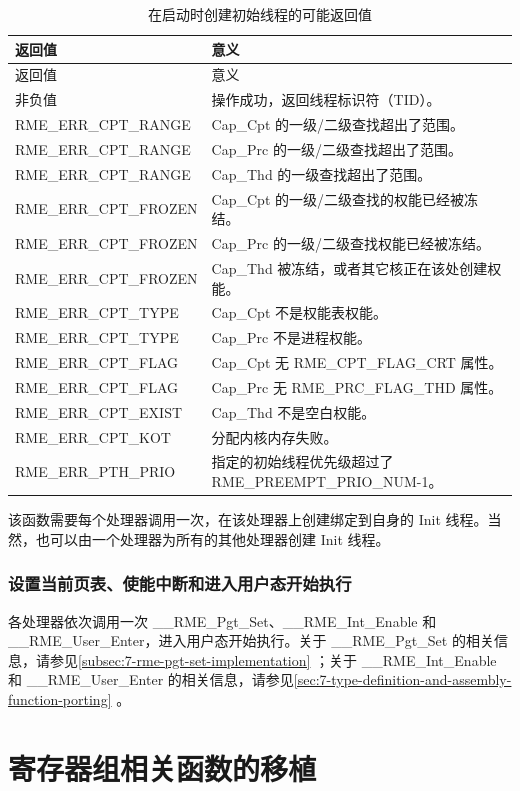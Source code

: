 \begin{xltabular}{\textwidth}{@{}>{\hsize\raggedright\arraybackslash}X>{\hsize\raggedright\arraybackslash}X@{}}
\caption{在启动时创建初始线程的可能返回值}\label{tab:7-60-create-initial-thread-at-boot-return-values}\\
\toprule
返回值 & 意义\tabularnewline
\endfirsthead
\toprule
返回值 & 意义\tabularnewline
\midrule
\endhead
\bottomrule
\endlastfoot
    非负值 & 操作成功，返回线程标识符（TID）。\tabularnewline
    RME\_ERR\_CPT\_RANGE & Cap\_Cpt 的一级/二级查找超出了范围。\tabularnewline
    RME\_ERR\_CPT\_RANGE & Cap\_Prc 的一级/二级查找超出了范围。\tabularnewline
    RME\_ERR\_CPT\_RANGE & Cap\_Thd 的一级查找超出了范围。\tabularnewline
    RME\_ERR\_CPT\_FROZEN & Cap\_Cpt 的一级/二级查找的权能已经被冻结。\tabularnewline
    RME\_ERR\_CPT\_FROZEN & Cap\_Prc 的一级/二级查找权能已经被冻结。\tabularnewline
    RME\_ERR\_CPT\_FROZEN & Cap\_Thd 被冻结，或者其它核正在该处创建权能。\tabularnewline
    RME\_ERR\_CPT\_TYPE & Cap\_Cpt 不是权能表权能。\tabularnewline
    RME\_ERR\_CPT\_TYPE & Cap\_Prc 不是进程权能。\tabularnewline
    RME\_ERR\_CPT\_FLAG & Cap\_Cpt 无 RME\_CPT\_FLAG\_CRT 属性。\tabularnewline
    RME\_ERR\_CPT\_FLAG & Cap\_Prc 无 RME\_PRC\_FLAG\_THD 属性。\tabularnewline
    RME\_ERR\_CPT\_EXIST & Cap\_Thd 不是空白权能。\tabularnewline
    RME\_ERR\_CPT\_KOT & 分配内核内存失败。\tabularnewline
    RME\_ERR\_PTH\_PRIO & 指定的初始线程优先级超过了 RME\_PREEMPT\_PRIO\_NUM-1。\tabularnewline
\end{xltabular}

该函数需要每个处理器调用一次，在该处理器上创建绑定到自身的 Init 线程。当然，也可以由一个处理器为所有的其他处理器创建 Init 线程。

\subsubsection{设置当前页表、使能中断和进入用户态开始执行}\label{subsubsec:7-set-page-table-enable-interrupt-and-enter-user-mode}

各处理器依次调用一次 \_\_RME\_Pgt\_Set、\_\_RME\_Int\_Enable 和 \_\_RME\_User\_Enter，进入用户态开始执行。关于 \_\_RME\_Pgt\_Set 的相关信息，请参见\ref{subsec:7-rme-pgt-set-implementation}
；关于 \_\_RME\_Int\_Enable 和 \_\_RME\_User\_Enter 的相关信息，请参见\ref{sec:7-type-definition-and-assembly-function-porting}
。

\section{寄存器组相关函数的移植}\label{sec:7-register-set-function-porting}

